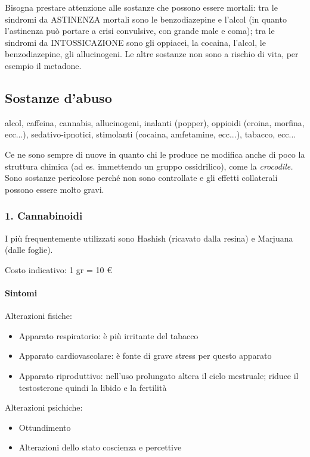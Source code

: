 Bisogna prestare attenzione alle sostanze che possono essere mortali:
tra le sindromi da ASTINENZA mortali sono le benzodiazepine e l'alcol
(in quanto l'astinenza può portare a crisi convulsive, con grande male e
coma); tra le sindromi da INTOSSICAZIONE sono gli oppiacei, la cocaina,
l'alcol, le benzodiazepine, gli allucinogeni. Le altre sostanze non sono
a rischio di vita, per esempio il metadone.

\subsection{Sostanze d'abuso}

alcol, caffeina, cannabis, allucinogeni, inalanti (popper), oppioidi
(eroina, morfina, ecc...), sedativo-ipnotici, stimolanti (cocaina,
amfetamine, ecc...), tabacco, ecc...

Ce ne sono sempre di nuove in quanto chi le produce ne modifica anche di
poco la struttura chimica (ad es. immettendo un gruppo ossidrilico),
come la \emph{crocodile.} Sono sostanze pericolose perché non sono
controllate e gli effetti collaterali possono essere molto gravi.

\subsubsection{1. Cannabinoidi}

I più frequentemente utilizzati sono Hashish (ricavato dalla resina) e
Marjuana (dalle foglie).

Costo indicativo: 1 gr = 10 \euro{}

\paragraph{Sintomi}

Alterazioni fisiche:

\begin{itemize}
\item
  Apparato respiratorio: è più irritante del tabacco
\item
  Apparato cardiovascolare: è fonte di grave stress per questo apparato
\item
  Apparato riproduttivo: nell'uso prolungato altera il ciclo mestruale;
  riduce il testosterone quindi la libido e la fertilità
\end{itemize}

Alterazioni psichiche:

\begin{itemize}
\item
  Ottundimento
\item
  Alterazioni dello stato coscienza e percettive
\end{itemize}

